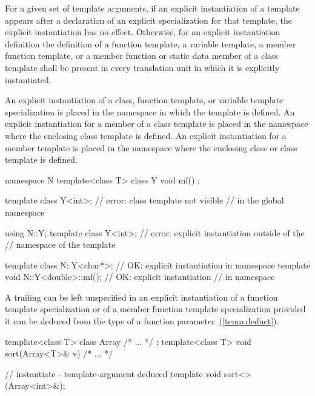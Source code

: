\pnum
For a given set of template arguments, if an explicit
instantiation of a template appears after a declaration of
an explicit specialization for that template, the explicit
instantiation has no effect. Otherwise, for an explicit instantiation
definition the definition of a
function template, a variable template, a member
function template, or a member function or static
data member of a class template shall be present in every
translation unit in which it is explicitly instantiated.

\pnum
An explicit instantiation of a class, function template, or variable template
specialization is
placed in the namespace in which the template is defined.
An explicit instantiation for a member of a class template is placed in
the namespace where the enclosing class template is defined.
An explicit instantiation for a member template is placed in the namespace
where the enclosing class or class template is defined.
\enterexample

\begin{codeblock}
namespace N {
  template<class T> class Y { void mf() { } };
}

template class Y<int>;                  // error: class template  not visible
                                        // in the global namespace

using N::Y;
template class Y<int>;                  // error: explicit instantiation outside of the
                                        // namespace of the template

template class N::Y<char*>;             // OK: explicit instantiation in namespace 
template void N::Y<double>::mf();       // OK: explicit instantiation
                                        // in namespace 
\end{codeblock}
\exitexample

\pnum
A trailing
can be left unspecified in an explicit instantiation of a function template
specialization or of a member function template specialization provided
it can be deduced from the type of a function parameter~(\ref{temp.deduct}).
\enterexample

\begin{codeblock}
template<class T> class Array { /* ... */ };
template<class T> void sort(Array<T>& v) { /* ... */ }

// instantiate  - template-argument deduced
template void sort<>(Array<int>&);
\end{codeblock}
\exitexample

